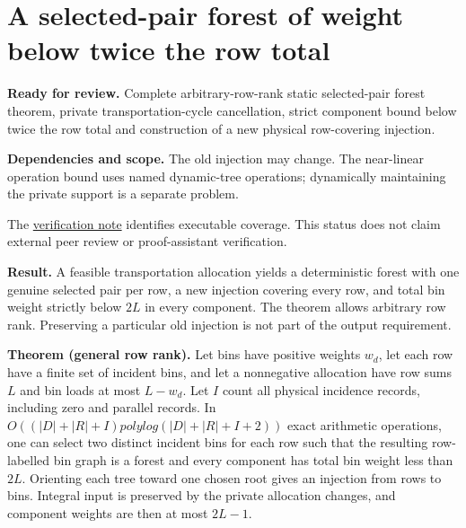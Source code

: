 
\hypertarget{af-c467a6f0ad-a-selected-pair-forest-of-weight-below-twice-the-row-total}{%
\section{A selected-pair forest of weight below twice the row total}\label{af-c467a6f0ad-a-selected-pair-forest-of-weight-below-twice-the-row-total}}

\textbf{Ready for review.} Complete arbitrary-row-rank static selected-pair forest theorem, private transportation-cycle cancellation, strict component bound below twice the row total and construction of a new physical row-covering injection.

\textbf{Dependencies and scope.} The old injection may change. The near-linear operation bound uses named dynamic-tree operations; dynamically maintaining the private support is a separate problem.

The \href{https://github.com/icekylinx/algorithm-frontier/blob/main/manuscripts/graph-backends/verify/README.md}{verification note} identifies executable coverage. This status does not claim external peer review or proof-assistant verification.

\textbf{Result.} A feasible transportation allocation yields a deterministic forest with one genuine selected pair per row, a new injection covering every row, and total bin weight strictly below \(2L\) in every component. The theorem allows arbitrary row rank. Preserving a particular old injection is not part of the output requirement.

\textbf{Theorem (general row rank).} Let bins have positive weights \(w_d\), let each row have a finite set of incident bins, and let a nonnegative allocation have row sums \(L\) and bin loads at most \(L-w_d\). Let \(I\) count all physical incidence records, including zero and parallel records. In \(O((|D|+|R|+I) polylog(|D|+|R|+I+2))\) exact arithmetic operations, one can select two distinct incident bins for each row such that the resulting row-labelled bin graph is a forest and every component has total bin weight less than \(2L\). Orienting each tree toward one chosen root gives an injection from rows to bins. Integral input is preserved by the private allocation changes, and component weights are then at most \(2L-1\).

